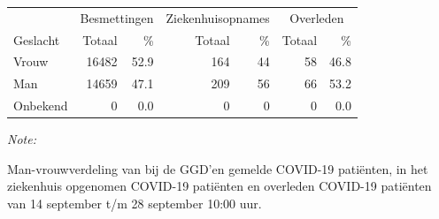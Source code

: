 \documentclass[
  english,
  man,floatsintext]{apa6}
\begin{document}
\begin{table}[H]
\centering\begingroup\fontsize{11}{13}\selectfont

\begin{threeparttable}
\begin{tabular}{lrrrrrr}
\toprule
\multicolumn{1}{c}{ } & \multicolumn{2}{c}{Besmettingen} & \multicolumn{2}{c}{Ziekenhuisopnames} & \multicolumn{2}{c}{Overleden} \\
\cmidrule(l{3pt}r{3pt}){2-3} \cmidrule(l{3pt}r{3pt}){4-5} \cmidrule(l{3pt}r{3pt}){6-7}
Geslacht & Totaal & \% & Totaal & \% & Totaal & \%\\
\midrule
Vrouw & 16482 & 52.9 & 164 & 44 & 58 & 46.8\\
Man & 14659 & 47.1 & 209 & 56 & 66 & 53.2\\
Onbekend & 0 & 0.0 & 0 & 0 & 0 & 0.0\\
\bottomrule
\end{tabular}
\begin{tablenotes}
\item \textit{Note: } 
\item Man-vrouwverdeling van bij de GGD’en gemelde COVID-19 patiënten, in het ziekenhuis opgenomen COVID-19 patiënten en overleden COVID-19 patiënten van 14 september t/m 28 september 10:00 uur.
\end{tablenotes}
\end{threeparttable}
\endgroup{}
\end{table}
\newpage
\end{document}
